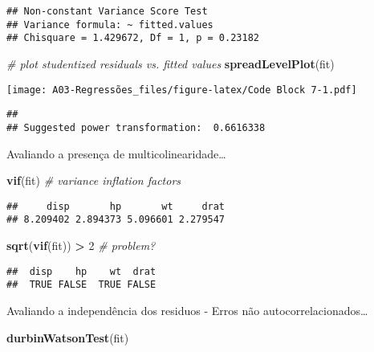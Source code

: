 \documentclass[]{article}
\newenvironment{Shaded}{\begin{snugshade}}{\end{snugshade}}
\newcommand{\CommentTok}[1]{\textcolor[rgb]{0.56,0.35,0.01}{\textit{#1}}}
\newcommand{\DecValTok}[1]{\textcolor[rgb]{0.00,0.00,0.81}{#1}}
\newcommand{\KeywordTok}[1]{\textcolor[rgb]{0.13,0.29,0.53}{\textbf{#1}}}
\newcommand{\NormalTok}[1]{#1}
\newcommand{\OperatorTok}[1]{\textcolor[rgb]{0.81,0.36,0.00}{\textbf{#1}}}
\newcommand{\StringTok}[1]{\textcolor[rgb]{0.31,0.60,0.02}{#1}}
\begin{document}
\begin{verbatim}
## Non-constant Variance Score Test 
## Variance formula: ~ fitted.values 
## Chisquare = 1.429672, Df = 1, p = 0.23182
\end{verbatim}

\begin{Shaded}
\begin{Highlighting}[]
\CommentTok{# plot studentized residuals vs. fitted values }
\KeywordTok{spreadLevelPlot}\NormalTok{(fit)}
\end{Highlighting}
\end{Shaded}

\texttt{[image: A03-Regressões\_files/figure-latex/Code Block 7-1.pdf]}

\begin{verbatim}
## 
## Suggested power transformation:  0.6616338
\end{verbatim}

Avaliando a presença de multicolinearidade\ldots{}

\begin{Shaded}
\begin{Highlighting}[]
\KeywordTok{vif}\NormalTok{(fit) }\CommentTok{# variance inflation factors }
\end{Highlighting}
\end{Shaded}

\begin{verbatim}
##     disp       hp       wt     drat 
## 8.209402 2.894373 5.096601 2.279547
\end{verbatim}

\begin{Shaded}
\begin{Highlighting}[]
\KeywordTok{sqrt}\NormalTok{(}\KeywordTok{vif}\NormalTok{(fit)) }\OperatorTok{>}\StringTok{ }\DecValTok{2} \CommentTok{# problem?}
\end{Highlighting}
\end{Shaded}

\begin{verbatim}
##  disp    hp    wt  drat 
##  TRUE FALSE  TRUE FALSE
\end{verbatim}

Avaliando a independência dos residuos - Erros não
autocorrelacionados\ldots{}

\begin{Shaded}
\begin{Highlighting}[]
\KeywordTok{durbinWatsonTest}\NormalTok{(fit)}
\end{Highlighting}
\end{Shaded}
\end{document}
